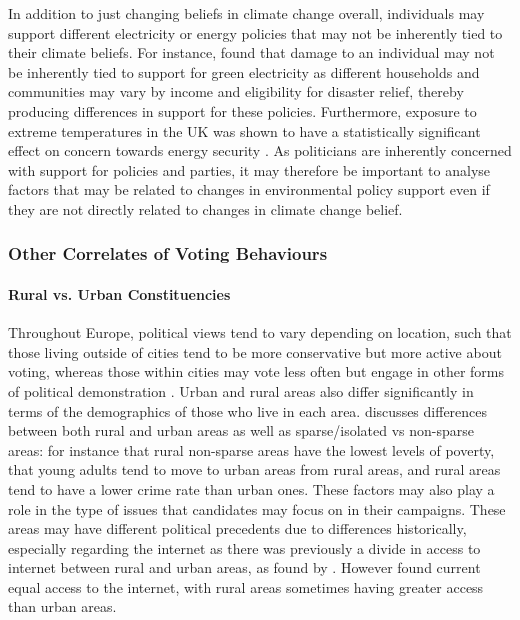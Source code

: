 \documentclass[12pt,letterpaper]{article}
\begin{document}
In addition to just changing beliefs in climate change overall, individuals may support different electricity or energy policies that may not be inherently tied to their climate beliefs. For instance, \textcite{osberghausCausalEffectFlood2019} found that damage to an individual may not be inherently tied to support for green electricity as different households and communities may vary by income and eligibility for disaster relief, thereby producing differences in support for these policies. Furthermore, exposure to extreme temperatures in the UK was shown to have a statistically significant effect on concern towards energy security \autocite{larcomUKSummerHeatwave2019a}. As politicians are inherently concerned with support for policies and parties, it may therefore be important to analyse factors that may be related to changes in environmental policy support even if they are not directly related to changes in climate change belief. 



\subsubsection{Other Correlates of Voting Behaviours}

\paragraph{Rural vs. Urban Constituencies}

Throughout Europe, political views tend to vary depending on location, such that those living outside of cities tend to be more conservative but more active about voting, whereas those within cities may vote less often but engage in other forms of political demonstration \autocite{kennyUrbanruralPolarisationPolitical2021}. Urban and rural areas also differ significantly in terms of the demographics of those who live in each area. \textcite{patemanRuralUrbanAreas2011} discusses differences between both rural and urban areas as well as sparse/isolated vs non-sparse areas: for instance that rural non-sparse areas have the lowest levels of poverty, that young adults tend to move to urban areas from rural areas, and rural areas tend to have a lower crime rate than urban ones. These factors may also play a role in the type of issues that candidates may focus on in their campaigns. These areas may have different political precedents due to differences historically, especially regarding the internet as there was previously a divide in access to internet between rural and urban areas, as found by \textcite{choudrieRealisingGovernmentUK2005}. However \textcite{patemanRuralUrbanAreas2011} found current equal access to the internet, with rural areas sometimes having greater access than urban areas.
\end{document}
